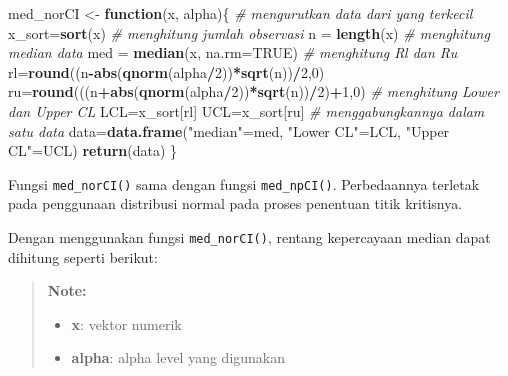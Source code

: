 \documentclass[]{book}
\newenvironment{Shaded}{\begin{snugshade}}{\end{snugshade}}
\newcommand{\KeywordTok}[1]{\textcolor[rgb]{0.13,0.29,0.53}{\textbf{#1}}}
\newcommand{\DataTypeTok}[1]{\textcolor[rgb]{0.13,0.29,0.53}{#1}}
\newcommand{\DecValTok}[1]{\textcolor[rgb]{0.00,0.00,0.81}{#1}}
\newcommand{\StringTok}[1]{\textcolor[rgb]{0.31,0.60,0.02}{#1}}
\newcommand{\CommentTok}[1]{\textcolor[rgb]{0.56,0.35,0.01}{\textit{#1}}}
\newcommand{\OtherTok}[1]{\textcolor[rgb]{0.56,0.35,0.01}{#1}}
\newcommand{\ControlFlowTok}[1]{\textcolor[rgb]{0.13,0.29,0.53}{\textbf{#1}}}
\newcommand{\OperatorTok}[1]{\textcolor[rgb]{0.81,0.36,0.00}{\textbf{#1}}}
\newcommand{\NormalTok}[1]{#1}
\providecommand{\tightlist}{%
  \setlength{\itemsep}{0pt}\setlength{\parskip}{0pt}}
\begin{document}
\begin{Shaded}
\begin{Highlighting}[]
\NormalTok{med_norCI <-}\StringTok{ }\ControlFlowTok{function}\NormalTok{(x, alpha)\{}
  \CommentTok{# mengurutkan data dari yang terkecil}
\NormalTok{  x_sort=}\KeywordTok{sort}\NormalTok{(x)}
  \CommentTok{# menghitung jumlah observasi}
\NormalTok{  n =}\StringTok{ }\KeywordTok{length}\NormalTok{(x)}
  \CommentTok{# menghitung median data}
\NormalTok{  med =}\StringTok{ }\KeywordTok{median}\NormalTok{(x, }\DataTypeTok{na.rm=}\OtherTok{TRUE}\NormalTok{)}
  \CommentTok{# menghitung Rl dan Ru}
\NormalTok{  rl=}\KeywordTok{round}\NormalTok{((n}\OperatorTok{-}\KeywordTok{abs}\NormalTok{(}\KeywordTok{qnorm}\NormalTok{(alpha}\OperatorTok{/}\DecValTok{2}\NormalTok{))}\OperatorTok{*}\KeywordTok{sqrt}\NormalTok{(n))}\OperatorTok{/}\DecValTok{2}\NormalTok{,}\DecValTok{0}\NormalTok{)}
\NormalTok{  ru=}\KeywordTok{round}\NormalTok{(((n}\OperatorTok{+}\KeywordTok{abs}\NormalTok{(}\KeywordTok{qnorm}\NormalTok{(alpha}\OperatorTok{/}\DecValTok{2}\NormalTok{))}\OperatorTok{*}\KeywordTok{sqrt}\NormalTok{(n))}\OperatorTok{/}\DecValTok{2}\NormalTok{)}\OperatorTok{+}\DecValTok{1}\NormalTok{,}\DecValTok{0}\NormalTok{)}
  \CommentTok{# menghitung Lower dan Upper CL}
\NormalTok{  LCL=x_sort[rl]}
\NormalTok{  UCL=x_sort[ru]}
  \CommentTok{# menggabungkannya dalam satu data}
\NormalTok{  data=}\KeywordTok{data.frame}\NormalTok{(}\StringTok{"median"}\NormalTok{=med,}
                  \StringTok{"Lower CL"}\NormalTok{=LCL,}
                  \StringTok{"Upper CL"}\NormalTok{=UCL)}
  \KeywordTok{return}\NormalTok{(data)}
\NormalTok{\}}
\end{Highlighting}
\end{Shaded}

Fungsi \texttt{med\_norCI()} sama dengan fungsi \texttt{med\_npCI()}.
Perbedaannya terletak pada penggunaan distribusi normal pada proses
penentuan titik kritisnya.

Dengan menggunakan fungsi \texttt{med\_norCI()}, rentang kepercayaan
median dapat dihitung seperti berikut:

\begin{quote}
\textbf{Note: }

\begin{itemize}
\tightlist
\item
  \textbf{x}: vektor numerik
\item
  \textbf{alpha}: alpha level yang digunakan
\end{itemize}
\end{quote}
\end{document}
